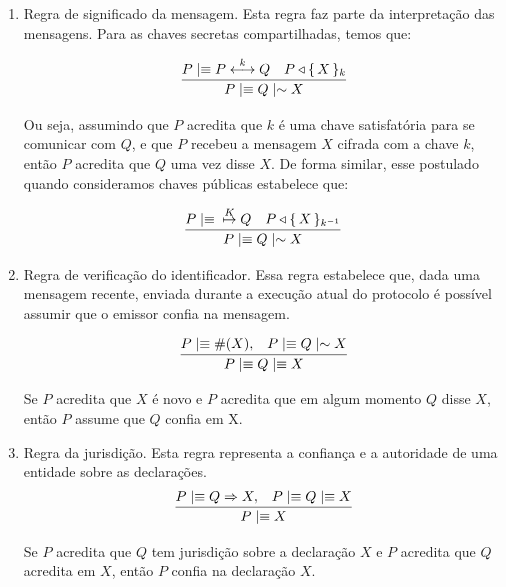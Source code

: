 \begin{enumerate}[(P1)]

 \item Regra de significado da mensagem. Esta regra faz parte da interpretação das mensagens. Para as chaves secretas compartilhadas, temos que:

    \begin{displaymath}
        \infer
        {{P}\mid\equiv{{Q}\mid\sim{X}}}
        {{P}\mid\equiv{\Share{P}{k}{Q}}& {P}\triangleleft{\Encrypt{X}{k}}}
    \end{displaymath}

Ou seja, assumindo que $P$ acredita que $k$ é uma chave satisfatória para se comunicar com $Q$, e que
$P$ recebeu a mensagem $X$ cifrada com a chave $k$, então $P$ acredita que $Q$ uma vez disse $X$.
De forma similar, esse postulado quando consideramos chaves públicas estabelece que:

    \begin{displaymath}
        \infer
        {{P}\mid\equiv{{Q}\mid\sim{X}}}
        {{P}\mid\equiv{\PubKey{K}{Q}}& {P}\triangleleft{\Encrypt{X}{k ^{-1}}}}
    \end{displaymath}


\item Regra de verificação do identificador. Essa regra estabelece que, dada uma mensagem recente, enviada durante a execução atual do protocolo é possível assumir que o emissor confia na mensagem.

  \begin{displaymath}
    \infer
    {{P}\mid\equiv{{Q}\mid\equiv{X}}}
    {{P}\mid\equiv{\#(X),}& {P}\mid\equiv{{Q}\mid\sim{X}}}
  \end{displaymath}

   Se $P$ acredita que $X$ é novo e $P$ acredita que em algum momento $Q$ disse $X$, então $P$ assume que $Q$ confia em X.

\item Regra da jurisdição. Esta regra representa a confiança e a autoridade de uma entidade sobre as declarações.
\begin{displaymath}
    \infer
    {{P}\mid\equiv{X}}
    {{P}\mid\equiv{{Q}\Rightarrow {X},}& {P}\mid\equiv{{Q}\mid\equiv{X}}}
  \end{displaymath}

   Se $P$  acredita que $Q$ tem jurisdição sobre a declaração $X$ e $P$ acredita que $Q$ acredita em $X$, então $P$ confia na declaração $X$.

\end{enumerate}


